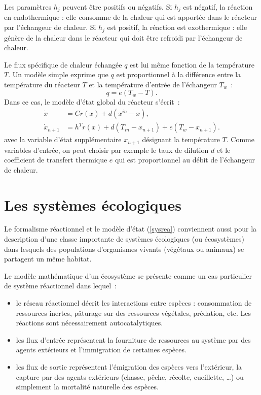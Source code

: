Les paramètres $h_j$ peuvent être positifs ou négatifs. Si
$h_j$ est négatif, la réaction en endothermique : elle
consomme de la chaleur qui est apportée dans le réacteur par
l'échangeur de chaleur. Si $h_j$ est positif, la réaction est
exothermique : elle génère de la chaleur dans le réacteur qui
doit être refroidi par l'échangeur de chaleur.

Le flux spécifique de chaleur échangée $q$ est lui même
fonction de la température $T$. Un modèle simple 
exprime que $q$ est proportionnel à la différence entre la
température du réacteur $T$ et la température d'entrée de
l'échangeur $T_w$~:
$$ q = e(T_w - T). $$
Dans ce cas, le modèle d'état global du réacteur s'écrit~:
\begin{equation*} \begin{split}
\dot x &= Cr(x) + d(x^{in} - x), \\
\dot x_{n+1} &= h^T r(x) + d(T_{in} - x_{n+1}) + e(T_w - x_{n+1}).
\end{split} \end{equation*}
avec la variable d'état supplémentaire $x_{n+1}$ désignant la
température $T$. Comme variables d'entrée, on peut choisir
par exemple le taux de dilution $d$ et le coefficient de
transfert thermique $e$ qui est proportionnel au débit de
l'échangeur de chaleur.

\section{Les systèmes écologiques} 

Le formalisme réactionnel et le
modèle d'état (\ref{sysrea}) conviennent aussi pour la description
d'une classe importante de systèmes écologiques (ou écosystèmes) dans
lesquels des populations d'organismes vivants (végétaux ou animaux) se
partagent un même habitat. 

Le modèle mathématique d'un écosystème se présente comme un cas
particulier de système réactionnel dans lequel~:
\begin{itemize}
\item le réseau réactionnel décrit les interactions entre espèces :
consommation de ressources inertes, pâturage sur des ressources
végétales, prédation, etc.  Les réactions sont nécessairement
autocatalytiques. 
\item les flux d'entrée représentent la fourniture de ressources au
système par des agents extérieurs et l'immigration de certaines espèces.
\item les flux de sortie représentent l'émigration des espèces vers
l'extérieur, la capture par des agents extérieurs (chasse, pêche, récolte,
cueillette, \dots) ou simplement la mortalité naturelle des espèces.
\end{itemize}

